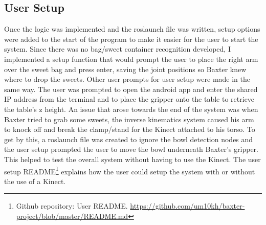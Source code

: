 \subsection{User Setup}
Once the logic was implemented and the roslaunch file was written, setup options were added to the start of the program to make it easier for the user to start the system. Since there was no bag/sweet container recognition developed, I implemented a setup function that would prompt the user to place the right arm over the sweet bag and press enter, saving the joint positions so Baxter knew where to drop the sweets. Other user prompts for user setup were made in the same way. The user was prompted to open the android app and enter the shared IP address from the terminal and to place the gripper onto the table to retrieve the table's z height.
\newline\newline
An issue that arose towards the end of the system was when Baxter tried to grab some sweets, the inverse kinematics system caused his arm to knock off and break the clamp/stand for the Kinect attached to his torso. To get by this, a roslaunch file was created to ignore the bowl detection nodes and the user setup prompted the user to move the bowl underneath Baxter's gripper. This helped to test the overall system without having to use the Kinect. The user setup README\footnote{Github repository: User README. \url{https://github.com/um10kh/baxter-project/blob/master/README.md}} explains how the user could setup the system with or without the use of a Kinect.
